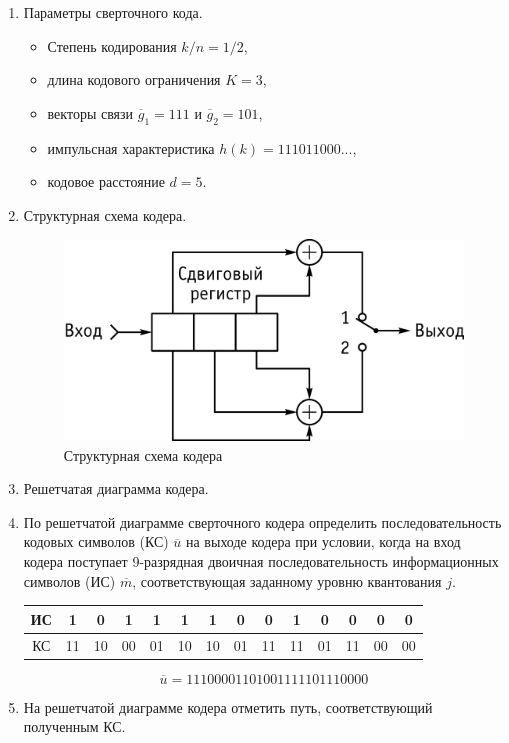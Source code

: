 \documentclass[a4paper, 12pt]{article}
\begin{document}
\begin{enumerate}
  \item Параметры сверточного кода.
  \begin{itemize}
    \item Степень кодирования $k/n=1/2$,
    \item длина кодового ограничения $K=3$,
    \item векторы связи $\overline g_1=111$ и 
    $\overline g_2=101$,
    \item импульсная характеристика $h(k)=111011000...$,
    \item кодовое расстояние $d=5$.
  \end{itemize}

  \item Структурная схема кодера.
  \begin{figure}[H]
    \centering
    \includegraphics[scale=0.8]{coder2}
    \caption{Структурная схема кодера}
  \end{figure}

  \item Решетчатая диаграмма кодера.
  

  \item По решетчатой диаграмме сверточного кодера определить
  последовательность кодовых символов (КС) $\overline u$ на выходе кодера 
  при условии, когда на вход кодера поступает 9-разрядная 
  двоичная последовательность информационных символов (ИС) 
  $\overline m$, соответствующая заданному уровню квантования $j$.
  \begin{center}
    \begin{tabular}{ |c|c|c|c|c|c|c|c|c|c|c|c|c|c| }
      \hline
      ИС &1&0&1&1&1&1&0&0&1&0&0&0&0\\
      \hline
      КС &11&10&00&01&10&10&01&11&11&01&11&00&00\\
      \hline
    \end{tabular}
  \end{center}
  \begin{equation}
    \overline u = 11 10 00 01 10 10 01 11 11 01 11 00 00 
  \end{equation}


  \item На решетчатой диаграмме кодера отметить путь, 
  соответствующий полученным КС.
  
\end{enumerate}
\end{document}
